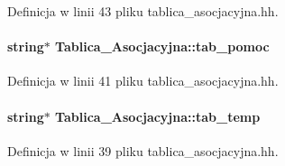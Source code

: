 \-Definicja w linii 43 pliku tablica\-\_\-asocjacyjna.\-hh.

\hypertarget{class_tablica___asocjacyjna_a99cf05ef90ca71d2970fa462ed753cd9}{
\paragraph[{tab\-\_\-pomoc}]{\setlength{\rightskip}{0pt plus 5cm}string$\ast$ {\bf \-Tablica\-\_\-\-Asocjacyjna\-::tab\-\_\-pomoc}}}\label{class_tablica___asocjacyjna_a99cf05ef90ca71d2970fa462ed753cd9}


\-Definicja w linii 41 pliku tablica\-\_\-asocjacyjna.\-hh.

\hypertarget{class_tablica___asocjacyjna_abf5b168ac5bcff6fb07870735fde78c8}{
\paragraph[{tab\-\_\-temp}]{\setlength{\rightskip}{0pt plus 5cm}string$\ast$ {\bf \-Tablica\-\_\-\-Asocjacyjna\-::tab\-\_\-temp}}}\label{class_tablica___asocjacyjna_abf5b168ac5bcff6fb07870735fde78c8}


\-Definicja w linii 39 pliku tablica\-\_\-asocjacyjna.\-hh.

